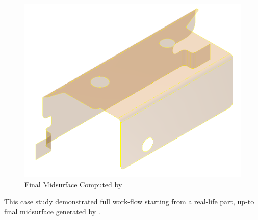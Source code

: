 
\begin{figure}[!h]
\centering     %
\includegraphics[width=0.62\linewidth,valign=t]{images/JBM_UBracket_midsurf_after_dormant_model}
\caption{Final Midsurface Computed by \mysystemname}
\label{fig:results:jbmfinal}
\end{figure}




%

This case study demonstrated full work-flow starting from a real-life part, up-to final midsurface generated by \mysystemname.


